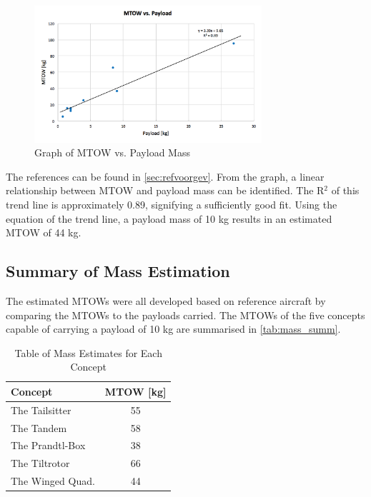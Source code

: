 \begin{figure}[H]
\label{fig:perfthing}
\centering
\includegraphics[width = 0.75\textwidth]{PerformanceAnalysis/Figures/MTOW_vs_PL_WQ.png}
\caption{Graph of MTOW vs. Payload Mass}
\end{figure}

The references can be found in \autoref{sec:refvoorgev}. From the graph, a linear relationship between MTOW and payload mass can be identified. The R$^2$ of this trend line is approximately 0.89, signifying a sufficiently good fit. Using the equation of the trend line, a payload mass of 10 kg results in an estimated MTOW of 44 kg.

\subsection{Summary of Mass Estimation}
The estimated MTOWs were all developed based on reference aircraft by comparing the MTOWs to the payloads carried. The MTOWs of the five concepts capable of carrying a payload of 10 kg are summarised in \autoref{tab:mass_summ}. 

\begin{table}[htb]
\centering
\caption{Table of Mass Estimates for Each Concept}
\label{tab:mass_summ}
    \begin{tabular}{lc}
        \toprule
            \textbf{Concept}           & \textbf{MTOW [kg]}\\ \midrule
         The Tailsitter       & 55 \\ \hdashline
         The Tandem           & 58 \\ \hdashline
         The Prandtl-Box      & 38   \\ \hdashline
         The Tiltrotor        & 66 \\ \hdashline
         The Winged Quad.     & 44 \\ \bottomrule
    \end{tabular}
\end{table}

